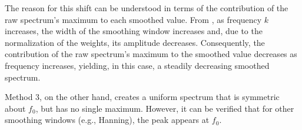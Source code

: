 The reason for this shift can be understood in terms of the contribution of the raw spectrum's maximum to each smoothed value.
From , as frequency $k$ increases, the width of the smoothing window increases and, due to the normalization of the weights, its amplitude decreases.
Consequently, the contribution of the raw spectrum's maximum to the smoothed value decreases as frequency increases, yielding, in this case, a steadily decreasing smoothed spectrum.

Method 3, on the other hand, creates a uniform spectrum that is symmetric about $f_0$, but has no single maximum.
However, it can be verified that for other smoothing windows (e.g., Hanning), the peak appears at $f_0$.